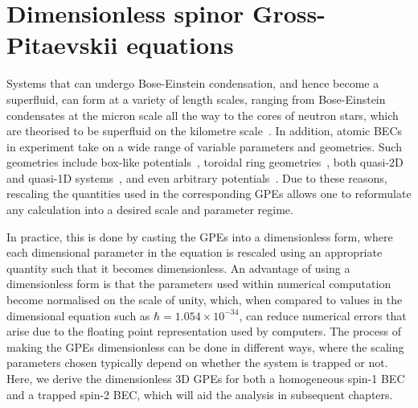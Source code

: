 \section{\label{sec: dimensionless-equations}
Dimensionless spinor Gross-Pitaevskii equations}
Systems that can undergo Bose-Einstein condensation, and hence become a
superfluid, can form at a variety of length scales, ranging from Bose-Einstein
condensates at the micron scale all the way to the cores of neutron stars,
which are theorised to be superfluid on the kilometre
scale~\cite{Warszawski2011}.
In addition, atomic BECs in experiment take on a wide range of variable
parameters and geometries.
Such geometries include box-like potentials~\cite{Gaunt2013}, toroidal ring
geometries~\cite{Ryu2007, Ramanathan2011}, both quasi-2D~\cite{Neely2010}
and quasi-1D systems~\cite{Burger1999}, and even arbitrary
potentials~\cite{Henderson2009}.
Due to these reasons, rescaling the quantities used in the corresponding GPEs
allows one to reformulate any calculation into a desired scale and parameter
regime.

In practice, this is done by casting the GPEs into a dimensionless form, where
each dimensional parameter in the equation is rescaled using an appropriate
quantity such that it becomes dimensionless.
An advantage of using a dimensionless form is that the parameters used within
numerical computation become normalised on the scale of unity, which,
when compared to values in the dimensional equation such as \(\hbar =
1.054\times 10^{-34}\), can reduce numerical errors that arise due to the
floating point representation used by computers.
The process of making the GPEs dimensionless can be done in different ways,
where the scaling parameters chosen typically depend on whether the system is
trapped or not.
Here, we derive the dimensionless 3D GPEs for both a homogeneous spin-1 BEC and
a trapped spin-2 BEC, which will aid the analysis in subsequent chapters.

